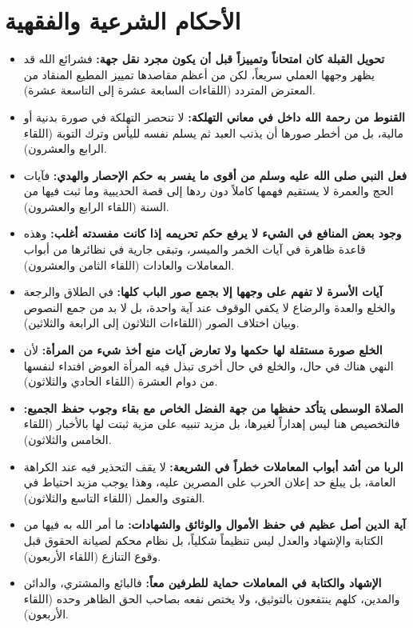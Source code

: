 \section{الأحكام الشرعية والفقهية}
\begin{itemize}
    \item \textbf{تحويل القبلة كان امتحاناً وتمييزاً قبل أن يكون مجرد نقل جهة:} فشرائع الله قد يظهر وجهها العملي سريعاً، لكن من أعظم مقاصدها تمييز المطيع المنقاد من المعترض المتردد (اللقاءات السابعة عشرة إلى التاسعة عشرة).
    \item \textbf{القنوط من رحمة الله داخل في معاني التهلكة:} لا تنحصر التهلكة في صورة بدنية أو مالية، بل من أخطر صورها أن يذنب العبد ثم يسلم نفسه لليأس وترك التوبة (اللقاء الرابع والعشرون).
    \item \textbf{فعل النبي صلى الله عليه وسلم من أقوى ما يفسر به حكم الإحصار والهدي:} فآيات الحج والعمرة لا يستقيم فهمها كاملاً دون ردها إلى قصة الحديبية وما ثبت فيها من السنة (اللقاء الرابع والعشرون).
    \item \textbf{وجود بعض المنافع في الشيء لا يرفع حكم تحريمه إذا كانت مفسدته أغلب:} وهذه قاعدة ظاهرة في آيات الخمر والميسر، وتبقى جارية في نظائرها من أبواب المعاملات والعادات (اللقاء الثامن والعشرون).
    \item \textbf{آيات الأسرة لا تفهم على وجهها إلا بجمع صور الباب كلها:} في الطلاق والرجعة والخلع والعدة والرضاع لا يكفي الوقوف عند آية واحدة، بل لا بد من جمع النصوص وبيان اختلاف الصور (اللقاءات الثلاثون إلى الرابعة والثلاثين).
    \item \textbf{الخلع صورة مستقلة لها حكمها ولا تعارض آيات منع أخذ شيء من المرأة:} لأن النهي هناك في حال، والخلع في حال أخرى تبذل فيه المرأة العوض افتداء لنفسها من دوام العشرة (اللقاء الحادي والثلاثون).
    \item \textbf{الصلاة الوسطى يتأكد حفظها من جهة الفضل الخاص مع بقاء وجوب حفظ الجميع:} فالتخصيص هنا ليس إهداراً لغيرها، بل مزيد تنبيه على مزية ثبتت لها بالأخبار (اللقاء الخامس والثلاثون).
    \item \textbf{الربا من أشد أبواب المعاملات خطراً في الشريعة:} لا يقف التحذير فيه عند الكراهة العامة، بل يبلغ حد إعلان الحرب على المصرين عليه، وهذا يوجب مزيد احتياط في الفتوى والعمل (اللقاء التاسع والثلاثون).
    \item \textbf{آية الدين أصل عظيم في حفظ الأموال والوثائق والشهادات:} ما أمر الله به فيها من الكتابة والإشهاد والعدل ليس تنظيماً شكلياً، بل نظام محكم لصيانة الحقوق قبل وقوع التنازع (اللقاء الأربعون).
    \item \textbf{الإشهاد والكتابة في المعاملات حماية للطرفين معاً:} فالبائع والمشتري، والدائن والمدين، كلهم ينتفعون بالتوثيق، ولا يختص نفعه بصاحب الحق الظاهر وحده (اللقاء الأربعون).
\end{itemize}

